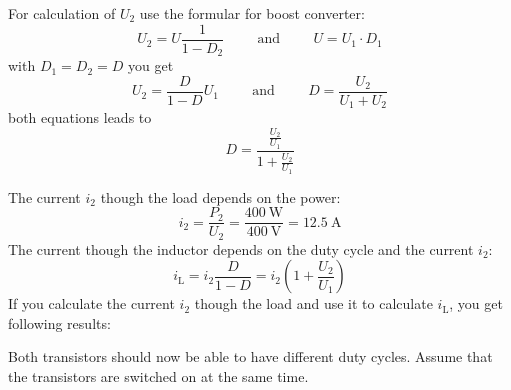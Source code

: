 \begin{solutionblock}
    For calculation of $U_\mathrm{2}$ use the formular for boost converter:
    \begin{equation}
        U_\mathrm{2}=U \frac{1}{1-D_\mathrm{2}} 
        \hspace{1cm} \mathrm{and} \hspace{1cm}  
        U=U_\mathrm{1} \cdot D_\mathrm{1}
    \end{equation}
    with $D_\mathrm{1}=D_\mathrm{2}=D$ you get
    \begin{equation}
        U_\mathrm{2}=\frac{D}{1-D} U_\mathrm{1}
        \hspace{1cm} \mathrm{and} \hspace{1cm}
        D=\frac{U_\mathrm{2}}{U_\mathrm{1}+U_\mathrm{2}}
    \end{equation}
    both equations leads to
    \begin{equation}
        D = \frac{\frac{U_\mathrm{2}}{U_\mathrm{1}}} {1+{\frac{U_\mathrm{2}}{U_\mathrm{1}}}}
    \end{equation}   
\end{solutionblock}

\begin{solutionblock}
    The current $i_\mathrm{2}$ though the load depends on the power:
    \begin{equation}
        i_\mathrm{2}=\frac{P_\mathrm{2}}{U_\mathrm{2}} = \frac{\SI{400}{\watt}}{\SI{400}{\volt}}=\SI{12.5}{\ampere}
    \end{equation}
    The current though the inductor depends on the duty cycle and the current $i_\mathrm{2}$:
    \begin{equation}
        i_\mathrm{L}=i_\mathrm{2} \frac{D}{1-D} = i_\mathrm{2} \left(1+\frac{U_\mathrm{2}}{U_\mathrm{1}} \right)
    \end{equation}
    If you calculate the current $i_\mathrm{2}$ though the load and use it to calculate $i_\mathrm{L}$, you get following results:

    
    
\end{solutionblock}
 

\vspace{2em}\par
Both transistors should now be able to have different duty cycles. Assume that the transistors are switched on at the same time.

